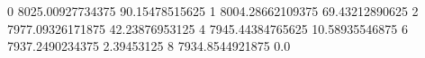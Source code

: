 0 8025.00927734375 90.15478515625
1 8004.28662109375 69.43212890625
2 7977.09326171875 42.23876953125
4 7945.44384765625 10.58935546875
6 7937.2490234375 2.39453125
8 7934.8544921875 0.0
